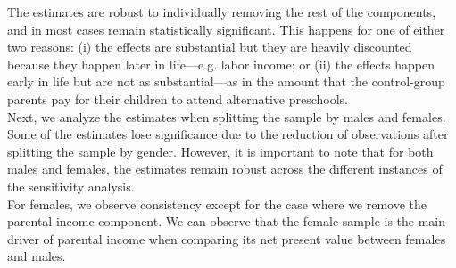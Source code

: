 \noindent The estimates are robust to individually removing the rest of the components, and in most cases remain statistically significant. This happens for one of either two reasons: (i) the effects are substantial but they are heavily discounted because they happen later in life---e.g. labor income; or (ii) the effects happen early in life but are not as substantial---as in the amount that the control-group parents pay for their children to attend alternative preschools.\\

\noindent Next, we analyze the estimates when splitting the sample by males and females. Some of the estimates lose significance due to the reduction of observations after splitting the sample by gender. However, it is important to note that for both males and females, the estimates remain robust across the different instances of the sensitivity analysis.\\

\noindent For females, we observe consistency except for the case where we remove the parental income component. We can observe that the female sample is the main driver of parental income when comparing its net present value between females and males.


